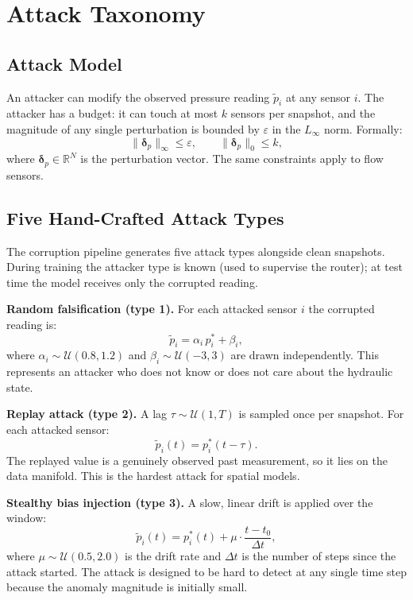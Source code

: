 \section{Attack Taxonomy}
\label{sec:attacks}

\subsection{Attack Model}

An attacker can modify the observed pressure reading $\tilde{p}_i$
at any sensor $i$. The attacker has a budget: it can touch at most
$k$ sensors per snapshot, and the magnitude of any single
perturbation is bounded by $\varepsilon$ in the $L_\infty$ norm.
Formally:
\begin{equation}
  \|\boldsymbol{\delta}_p\|_\infty \leq \varepsilon, \qquad
  \|\boldsymbol{\delta}_p\|_0 \leq k,
\end{equation}
where $\boldsymbol{\delta}_p \in \mathbb{R}^N$ is the perturbation
vector. The same constraints apply to flow sensors.

\subsection{Five Hand-Crafted Attack Types}

The corruption pipeline generates five attack types alongside clean
snapshots. During training the attacker type is known (used to
supervise the router); at test time the model receives only the
corrupted reading.

\textbf{Random falsification (type 1).} For each attacked sensor $i$
the corrupted reading is:
\begin{equation}
  \tilde{p}_i = \alpha_i \, p_i^* + \beta_i,
\end{equation}
where $\alpha_i \sim \mathcal{U}(0.8, 1.2)$ and $\beta_i \sim
\mathcal{U}(-3, 3)$ are drawn independently. This represents an
attacker who does not know or does not care about the hydraulic
state.

\textbf{Replay attack (type 2).} A lag $\tau \sim \mathcal{U}(1, T)$
is sampled once per snapshot. For each attacked sensor:
\begin{equation}
  \tilde{p}_i(t) = p_i^*(t - \tau).
\end{equation}
The replayed value is a genuinely observed past measurement, so it
lies on the data manifold. This is the hardest attack for spatial
models.

\textbf{Stealthy bias injection (type 3).} A slow, linear drift is
applied over the window:
\begin{equation}
  \tilde{p}_i(t) = p_i^*(t) + \mu \cdot \frac{t - t_0}{\Delta t},
\end{equation}
where $\mu \sim \mathcal{U}(0.5, 2.0)$ is the drift rate and $\Delta t$
is the number of steps since the attack started. The attack is
designed to be hard to detect at any single time step because the
anomaly magnitude is initially small.

